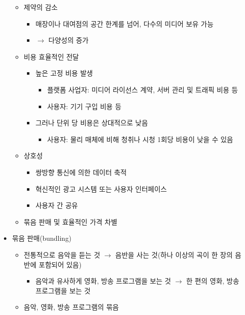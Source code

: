 \begin{itemize}
\begin{itemize}
\begin{itemize}
\begin{itemize}
			\end{itemize}
		\end{itemize}		
	\item 제약의 감소
		\begin{itemize}
		\item 매장이나 대여점의 공간 한계를 넘어, 다수의 미디어 보유 가능
		\item $\rightarrow$ 다양성의 증가
		\end{itemize}
	\item 비용 효율적인 전달
		\begin{itemize}
		\item 높은 고정 비용 발생
			\begin{itemize}
			\item 플랫폼 사업자: 미디어 라이선스 계약, 서버 관리 및 트래픽 비용 등
			\item 사용자: 기기 구입 비용 등
			\end{itemize}
		\item 그러나 단위 당 비용은 상대적으로 낮음
			\begin{itemize}
			\item 사용자: 물리 매체에 비해 청취나 시청 1회당 비용이 낮을 수 있음
			\end{itemize}
		\end{itemize}
	\item 상호성
		\begin{itemize}
		\item 쌍방향 통신에 의한 데이터 축적
		\item 혁신적인 광고 시스템 또는 사용자 인터페이스
		\item 사용자 간 공유
		\end{itemize}
	\item 묶음 판매 및 효율적인 가격 차별
	\end{itemize}	
\item 묶음 판매(bundling)
	\begin{itemize}
	\item 전통적으로 음악을 듣는 것 $\rightarrow$ 음반을 사는 것(하나 이상의 곡이 한 장의 음반에 포함되어 있음)
		\begin{itemize}
		\item 음악과 유사하게 영화, 방송 프로그램을 보는 것 $\rightarrow$ 한 편의 영화, 방송 프로그램을 보는 것	
		\end{itemize}
	\item 음악, 영화, 방송 프로그램의 묶음
		\begin{itemize}

\end{itemize}
\end{itemize}
\end{itemize}

